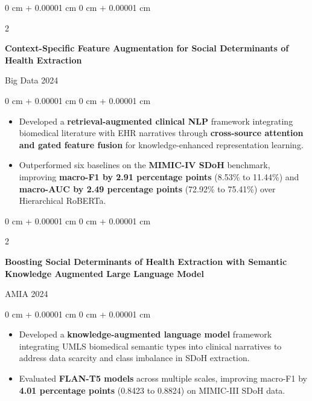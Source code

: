 \documentclass[10pt, letterpaper]{article}
\newenvironment{highlights}{
    \begin{itemize}[
        topsep=0.10 cm,
        parsep=0.10 cm,
        partopsep=0pt,
        itemsep=0pt,
        leftmargin=0 cm + 10pt
    ]
}{
    \end{itemize}
} %
\newenvironment{onecolentry}{
    \begin{adjustwidth}{
        0 cm + 0.00001 cm
    }{
        0 cm + 0.00001 cm
    }
}{
    \end{adjustwidth}
} %
\newenvironment{twocolentry}[2][]{
    \onecolentry
    \def\secondColumn{#2}
    \setcolumnwidth{\fill, 4.5 cm}
    \begin{paracol}{2}
}{
    \switchcolumn \raggedleft \secondColumn
    \end{paracol}
    \endonecolentry
} %
\begin{document}
\vspace{0.10 cm}


\begin{twocolentry}{
    Big Data 2024
}
    \textbf{Context-Specific Feature Augmentation for Social Determinants of Health Extraction}
\end{twocolentry}

\vspace{0.05 cm}
\begin{onecolentry}
    \begin{highlights}
        \item Developed a \textbf{retrieval-augmented clinical NLP} framework integrating biomedical literature with EHR narratives through \textbf{cross-source attention and gated feature fusion} for knowledge-enhanced representation learning.

        \item Outperformed six baselines on the \textbf{MIMIC-IV SDoH} benchmark, improving \textbf{macro-F1 by 2.91 percentage points} (8.53\% to 11.44\%) and \textbf{macro-AUC by 2.49 percentage points} (72.92\% to 75.41\%) over Hierarchical RoBERTa.
    \end{highlights}
\end{onecolentry}

\vspace{0.10 cm}


\begin{twocolentry}{
    AMIA 2024
}
    \textbf{Boosting Social Determinants of Health Extraction with Semantic Knowledge Augmented Large Language Model}
\end{twocolentry}

\vspace{0.05 cm}
\begin{onecolentry}
    \begin{highlights}
        \item Developed a \textbf{knowledge-augmented language model} framework integrating UMLS biomedical semantic types into clinical narratives to address data scarcity and class imbalance in SDoH extraction.

        \item Evaluated \textbf{FLAN-T5 models} across multiple scales, improving macro-F1 by \textbf{4.01 percentage points} (0.8423 to 0.8824) on MIMIC-III SDoH data.
    \end{highlights}
\end{onecolentry}
\end{document}
